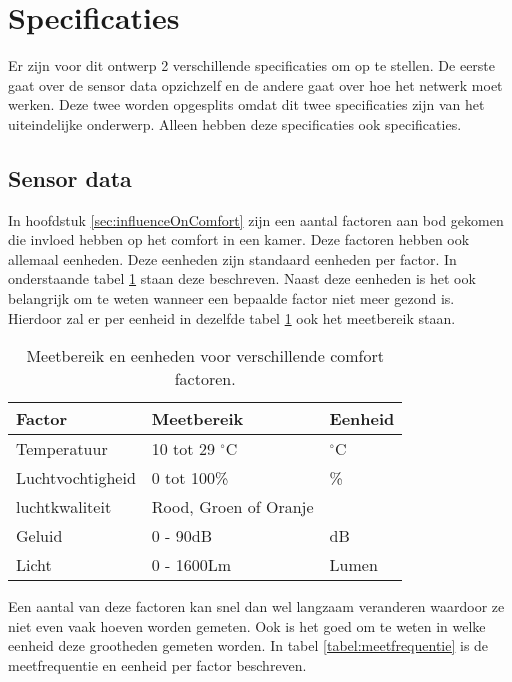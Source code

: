 \section{Specificaties}

Er zijn voor dit ontwerp 2 verschillende specificaties om op te stellen. De eerste gaat over de sensor data opzichzelf en de andere gaat over hoe 
het netwerk moet werken. Deze twee worden opgesplits omdat dit twee specificaties zijn van het uiteindelijke onderwerp. Alleen hebben deze specificaties 
ook specificaties.

\subsection{Sensor data}
In hoofdstuk \ref{sec:influenceOnComfort} zijn een aantal factoren aan bod gekomen die invloed hebben op het comfort in een kamer.
Deze factoren hebben ook allemaal eenheden. Deze eenheden zijn standaard eenheden per factor. In onderstaande tabel \ref{tabel:meetbereik} staan deze beschreven.
Naast deze eenheden is het ook belangrijk om te weten wanneer een bepaalde factor niet meer gezond is. Hierdoor zal er per eenheid in dezelfde 
tabel \ref{tabel:meetbereik} ook het meetbereik staan.

\begin{table}[h]
    \centering
    \begin{tabular}{|l|l|l|}\hline
        Factor           & Meetbereik            & Eenheid     \\\hline
        Temperatuur      & 10 tot 29 $^{\circ}$C & $^{\circ}$C \\\hline
        Luchtvochtigheid & 0 tot 100\%           & \%          \\\hline
        luchtkwaliteit   & Rood, Groen of Oranje &             \\\hline
        Geluid           & 0 - 90dB              & dB          \\\hline
        Licht            & 0 - 1600Lm            & Lumen       \\\hline
    \end{tabular}
    \caption{Meetbereik en eenheden voor verschillende comfort factoren.}
    \label{tabel:meetbereik}
\end{table}

Een aantal van deze factoren kan snel dan wel langzaam veranderen waardoor ze niet even vaak hoeven worden gemeten. Ook is het goed
 om te weten in welke eenheid deze grootheden gemeten worden. In tabel \ref{tabel:meetfrequentie} is de meetfrequentie en eenheid per 
 factor beschreven.

